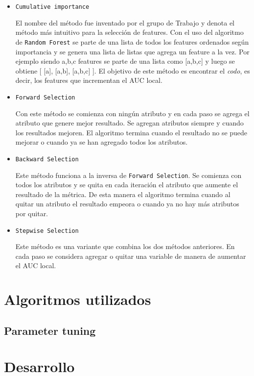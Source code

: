 \documentclass[a4paper]{article}
\begin{document}
\begin {itemize}
\item \texttt{Cumulative importance}

El nombre del método fue inventado por el grupo de Trabajo y denota el método más intuitivo para la selección de features. Con el uso del algoritmo de \texttt{Random Forest} se parte de una lista de todos los features ordenados según importancia y se genera una lista de listas que agrega un feature a la vez. Por ejemplo siendo a,b,c features se parte de una lista como [a,b,c] y luego se obtiene  [ [a], [a,b], [a,b,c] ]. El objetivo de este método es encontrar el 
\textit{codo}, es decir, los features que incrementan el AUC local.

\item \texttt{Forward Selection}

Con este método se comienza con ningún atributo y en cada paso se agrega el atributo que genere mejor resultado. Se agregan atributos siempre y cuando los resultados mejoren. El algoritmo termina cuando el resultado no se puede mejorar o cuando ya se han agregado todos los atributos.

\item \texttt{Backward Selection}

Este método funciona a la inversa de \texttt{Forward Selection}. Se comienza con todos los atributos y se quita en cada iteración el atributo que aumente el resultado de la métrica. De esta manera el algoritmo termina cuando al quitar un atributo el resultado empeora o cuando ya no hay más atributos por quitar.

\item \texttt{Stepwise Selection}

Este método es una variante que combina los dos métodos anteriores. En cada paso se considera agregar o quitar una variable de manera de aumentar el AUC local.	

\end {itemize}


\section{Algoritmos utilizados}

\subsection{Parameter tuning}

\section{Desarrollo}
\end{document}
